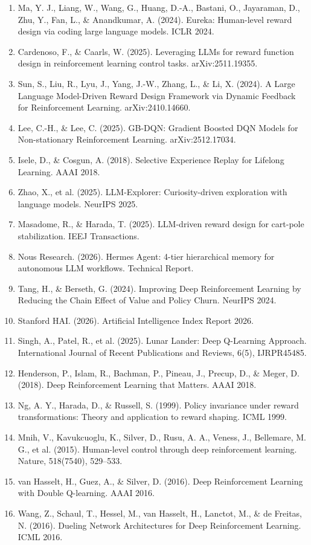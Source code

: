 \begin{enumerate}
\def\labelenumi{\arabic{enumi}.}
\tightlist
\item
  Ma, Y. J., Liang, W., Wang, G., Huang, D.-A., Bastani, O., Jayaraman, D., Zhu, Y., Fan, L., \& Anandkumar, A. (2024). Eureka: Human-level reward design via coding large language models. ICLR 2024.
\item
  Cardenoso, F., \& Caarls, W. (2025). Leveraging LLMs for reward function design in reinforcement learning control tasks. arXiv:2511.19355.
\item
  Sun, S., Liu, R., Lyu, J., Yang, J.-W., Zhang, L., \& Li, X. (2024). A Large Language Model-Driven Reward Design Framework via Dynamic Feedback for Reinforcement Learning. arXiv:2410.14660.
\item
  Lee, C.-H., \& Lee, C. (2025). GB-DQN: Gradient Boosted DQN Models for Non-stationary Reinforcement Learning. arXiv:2512.17034.
\item
  Isele, D., \& Cosgun, A. (2018). Selective Experience Replay for Lifelong Learning. AAAI 2018.
\item
  Zhao, X., et al. (2025). LLM-Explorer: Curiosity-driven exploration with language models. NeurIPS 2025.
\item
  Masadome, R., \& Harada, T. (2025). LLM-driven reward design for cart-pole stabilization. IEEJ Transactions.
\item
  Nous Research. (2026). Hermes Agent: 4-tier hierarchical memory for autonomous LLM workflows. Technical Report.
\item
  Tang, H., \& Berseth, G. (2024). Improving Deep Reinforcement Learning by Reducing the Chain Effect of Value and Policy Churn. NeurIPS 2024.
\item
  Stanford HAI. (2026). Artificial Intelligence Index Report 2026.
\item
  Singh, A., Patel, R., et al. (2025). Lunar Lander: Deep Q-Learning Approach. International Journal of Recent Publications and Reviews, 6(5), IJRPR45485.
\item
  Henderson, P., Islam, R., Bachman, P., Pineau, J., Precup, D., \& Meger, D. (2018). Deep Reinforcement Learning that Matters. AAAI 2018.
\item
  Ng, A. Y., Harada, D., \& Russell, S. (1999). Policy invariance under reward transformations: Theory and application to reward shaping. ICML 1999.
\item
  Mnih, V., Kavukcuoglu, K., Silver, D., Rusu, A. A., Veness, J., Bellemare, M. G., et al. (2015). Human-level control through deep reinforcement learning. Nature, 518(7540), 529--533.
\item
  van Hasselt, H., Guez, A., \& Silver, D. (2016). Deep Reinforcement Learning with Double Q-learning. AAAI 2016.
\item
  Wang, Z., Schaul, T., Hessel, M., van Hasselt, H., Lanctot, M., \& de Freitas, N. (2016). Dueling Network Architectures for Deep Reinforcement Learning. ICML 2016.
\end{enumerate}

